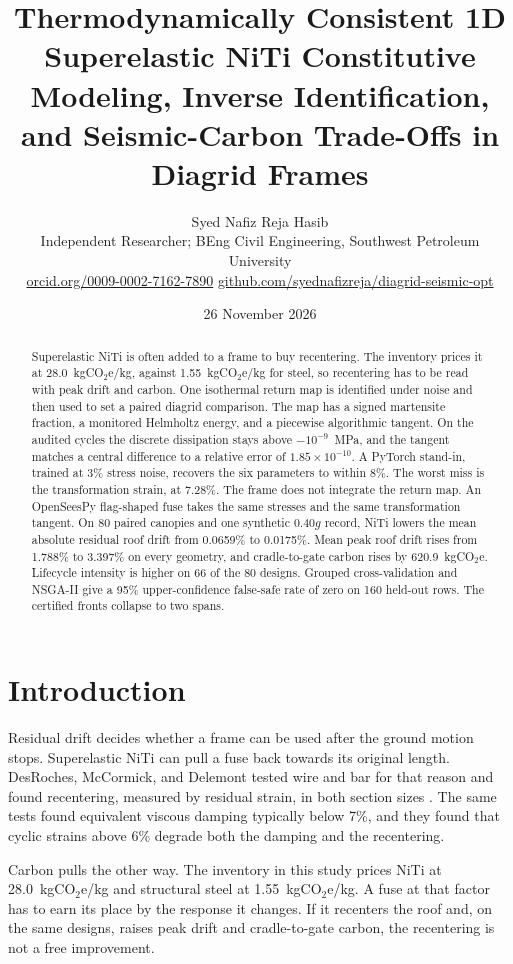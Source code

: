 \documentclass[10pt,a4paper]{article}
\title{Thermodynamically Consistent 1D Superelastic NiTi Constitutive Modeling, Inverse Identification, and Seismic-Carbon Trade-Offs in Diagrid Frames}
\author{%
  Syed Nafiz Reja Hasib\\[0.2em]
  {\normalsize Independent Researcher;\quad
  BEng Civil Engineering, Southwest Petroleum University}\\[0.45em]
  {\normalsize
  \href{https://orcid.org/0009-0002-7162-7890}{orcid.org/0009-0002-7162-7890}
  \quad
  \href{https://github.com/syednafizreja/diagrid-seismic-opt}{github.com/syednafizreja/diagrid-seismic-opt}}%
}
\date{26 November 2026}
\begin{document}
\maketitle

\begin{abstract}
\noindent
Superelastic NiTi is often added to a frame to buy recentering. The inventory prices it at 28.0~kgCO$_2$e/kg, against 1.55~kgCO$_2$e/kg for steel, so recentering has to be read with peak drift and carbon. One isothermal return map is identified under noise and then used to set a paired diagrid comparison. The map has a signed martensite fraction, a monitored Helmholtz energy, and a piecewise algorithmic tangent. On the audited cycles the discrete dissipation stays above $-10^{-9}$~MPa, and the tangent matches a central difference to a relative error of $1.85\times 10^{-10}$. A PyTorch stand-in, trained at 3\% stress noise, recovers the six parameters to within 8\%. The worst miss is the transformation strain, at 7.28\%. The frame does not integrate the return map. An OpenSeesPy flag-shaped fuse takes the same stresses and the same transformation tangent. On 80 paired canopies and one synthetic $0.40g$ record, NiTi lowers the mean absolute residual roof drift from 0.0659\% to 0.0175\%. Mean peak roof drift rises from 1.788\% to 3.397\% on every geometry, and cradle-to-gate carbon rises by 620.9~kgCO$_2$e. Lifecycle intensity is higher on 66 of the 80 designs. Grouped cross-validation and NSGA-II give a 95\% upper-confidence false-safe rate of zero on 160 held-out rows. The certified fronts collapse to two spans.
\end{abstract}

\section{Introduction}
\label{sec:intro}

Residual drift decides whether a frame can be used after the ground motion stops. Superelastic NiTi can pull a fuse back towards its original length. DesRoches, McCormick, and Delemont tested wire and bar for that reason and found recentering, measured by residual strain, in both section sizes \cite{desroches2004}. The same tests found equivalent viscous damping typically below 7\%, and they found that cyclic strains above 6\% degrade both the damping and the recentering.

Carbon pulls the other way. The inventory in this study prices NiTi at 28.0~kgCO$_2$e/kg and structural steel at 1.55~kgCO$_2$e/kg. A fuse at that factor has to earn its place by the response it changes. If it recenters the roof and, on the same designs, raises peak drift and cradle-to-gate carbon, the recentering is not a free improvement.
\end{document}

